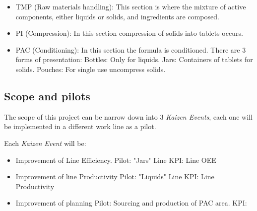 \documentclass[]{article}
\begin{document}
\begin{itemize}
  \item TMP (Raw materials handling):
    \subitem This section is where the mixture of active components, either liquids or solids, and ingredients are composed.
  \item PI (Compression):
    \subitem In this section compression of solids into tablets occurs.
  \item PAC (Conditioning):
    \subitem In this section the formula is conditioned. There are 3 forms of presentation:
    \subsubitem Bottles: Only for liquids.
    \subsubitem Jars: Containers of tablets for solids.
    \subsubitem Pouches: For single use uncompress solids.
\end{itemize}

\subsection{Scope and pilots}
The scope of this project can be narrow down into 3 \textit{Kaizen Events}, each one will be implemented in a different work line as a pilot. 

Each \textit{Kaizen Event} will be:
\begin{itemize}
  \item Improvement of Line Efficiency.
    \subitem Pilot: "Jars" Line
    \subitem KPI: Line OEE
  \item Improvement of line Productivity
    \subitem Pilot: "Liquids" Line
    \subitem KPI: Line Productivity
  \item Improvement of planning
    \subitem Pilot: Sourcing and production of PAC area.
    \subitem KPI: 
\end{itemize}



\clearpage
\newpage
\printbibliography[heading=bibnumbered]
\end{document}
